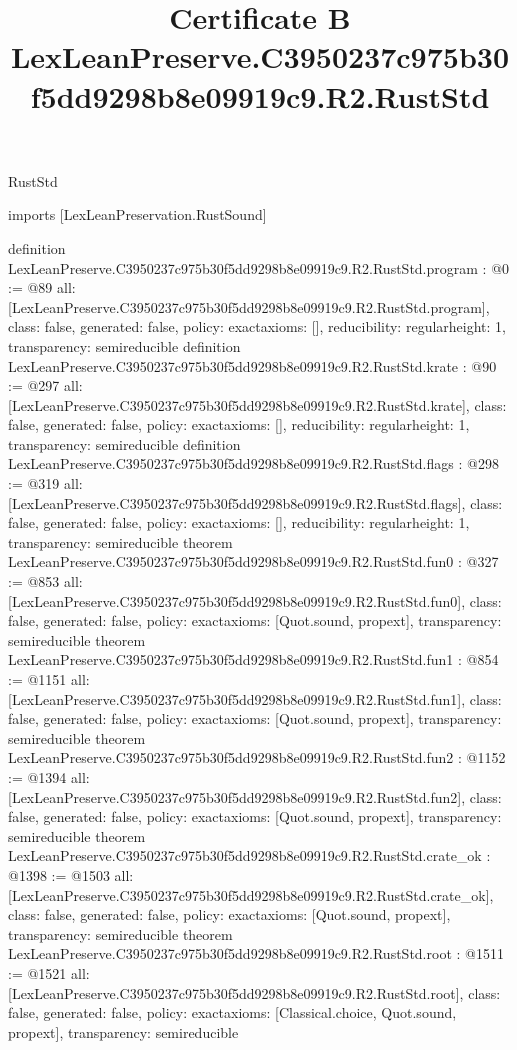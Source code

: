 \begin{lexlean}{RustStd}
\title{Certificate B LexLeanPreserve.C3950237c975b30f5dd9298b8e09919c9.R2.RustStd}
\begin{coremodule}
imports [LexLeanPreservation.RustSound]

definition LexLeanPreserve.C3950237c975b30f5dd9298b8e09919c9.R2.RustStd.program : @0 := @89 {
  all: [LexLeanPreserve.C3950237c975b30f5dd9298b8e09919c9.R2.RustStd.program],
  class: false,
  generated: false,
  policy: exact{axioms: []},
  reducibility: regular{height: 1},
  transparency: semireducible
}
definition LexLeanPreserve.C3950237c975b30f5dd9298b8e09919c9.R2.RustStd.krate : @90 := @297 {
  all: [LexLeanPreserve.C3950237c975b30f5dd9298b8e09919c9.R2.RustStd.krate],
  class: false,
  generated: false,
  policy: exact{axioms: []},
  reducibility: regular{height: 1},
  transparency: semireducible
}
definition LexLeanPreserve.C3950237c975b30f5dd9298b8e09919c9.R2.RustStd.flags : @298 := @319 {
  all: [LexLeanPreserve.C3950237c975b30f5dd9298b8e09919c9.R2.RustStd.flags],
  class: false,
  generated: false,
  policy: exact{axioms: []},
  reducibility: regular{height: 1},
  transparency: semireducible
}
theorem LexLeanPreserve.C3950237c975b30f5dd9298b8e09919c9.R2.RustStd.fun0 : @327 := @853 {
  all: [LexLeanPreserve.C3950237c975b30f5dd9298b8e09919c9.R2.RustStd.fun0],
  class: false,
  generated: false,
  policy: exact{axioms: [Quot.sound, propext]},
  transparency: semireducible
}
theorem LexLeanPreserve.C3950237c975b30f5dd9298b8e09919c9.R2.RustStd.fun1 : @854 := @1151 {
  all: [LexLeanPreserve.C3950237c975b30f5dd9298b8e09919c9.R2.RustStd.fun1],
  class: false,
  generated: false,
  policy: exact{axioms: [Quot.sound, propext]},
  transparency: semireducible
}
theorem LexLeanPreserve.C3950237c975b30f5dd9298b8e09919c9.R2.RustStd.fun2 : @1152 := @1394 {
  all: [LexLeanPreserve.C3950237c975b30f5dd9298b8e09919c9.R2.RustStd.fun2],
  class: false,
  generated: false,
  policy: exact{axioms: [Quot.sound, propext]},
  transparency: semireducible
}
theorem LexLeanPreserve.C3950237c975b30f5dd9298b8e09919c9.R2.RustStd.crate_ok : @1398 := @1503 {
  all: [LexLeanPreserve.C3950237c975b30f5dd9298b8e09919c9.R2.RustStd.crate_ok],
  class: false,
  generated: false,
  policy: exact{axioms: [Quot.sound, propext]},
  transparency: semireducible
}
theorem LexLeanPreserve.C3950237c975b30f5dd9298b8e09919c9.R2.RustStd.root : @1511 := @1521 {
  all: [LexLeanPreserve.C3950237c975b30f5dd9298b8e09919c9.R2.RustStd.root],
  class: false,
  generated: false,
  policy: exact{axioms: [Classical.choice, Quot.sound, propext]},
  transparency: semireducible
}


\end{coremodule}
\end{lexlean}
